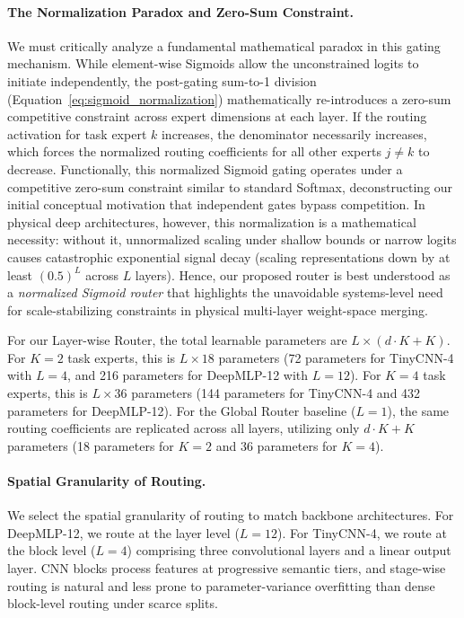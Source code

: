 \paragraph{The Normalization Paradox and Zero-Sum Constraint.} We must critically analyze a fundamental mathematical paradox in this gating mechanism. While element-wise Sigmoids allow the unconstrained logits to initiate independently, the post-gating sum-to-1 division (Equation~\ref{eq:sigmoid_normalization}) mathematically re-introduces a zero-sum competitive constraint across expert dimensions at each layer. If the routing activation for task expert $k$ increases, the denominator necessarily increases, which forces the normalized routing coefficients for all other experts $j \neq k$ to decrease. Functionally, this normalized Sigmoid gating operates under a competitive zero-sum constraint similar to standard Softmax, deconstructing our initial conceptual motivation that independent gates bypass competition. In physical deep architectures, however, this normalization is a mathematical necessity: without it, unnormalized scaling under shallow bounds or narrow logits causes catastrophic exponential signal decay (scaling representations down by at least $(0.5)^L$ across $L$ layers). Hence, our proposed router is best understood as a \emph{normalized Sigmoid router} that highlights the unavoidable systems-level need for scale-stabilizing constraints in physical multi-layer weight-space merging.

For our Layer-wise Router, the total learnable parameters are $L \times (d \cdot K + K)$. For $K=2$ task experts, this is $L \times 18$ parameters (72 parameters for TinyCNN-4 with $L=4$, and 216 parameters for DeepMLP-12 with $L=12$). For $K=4$ task experts, this is $L \times 36$ parameters (144 parameters for TinyCNN-4 and 432 parameters for DeepMLP-12). For the Global Router baseline ($L=1$), the same routing coefficients are replicated across all layers, utilizing only $d \cdot K + K$ parameters (18 parameters for $K=2$ and 36 parameters for $K=4$).

\paragraph{Spatial Granularity of Routing.} We select the spatial granularity of routing to match backbone architectures. For DeepMLP-12, we route at the layer level ($L=12$). For TinyCNN-4, we route at the block level ($L=4$) comprising three convolutional layers and a linear output layer. CNN blocks process features at progressive semantic tiers, and stage-wise routing is natural and less prone to parameter-variance overfitting than dense block-level routing under scarce splits.

